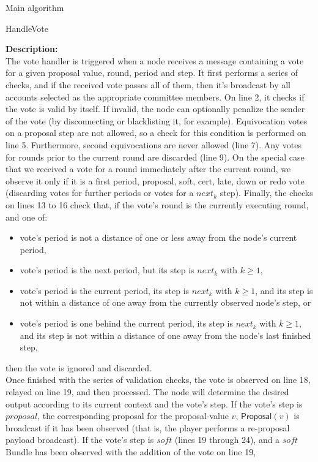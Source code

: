 \documentclass[10pt,a4paper]{article}
\begin{document}
\begin{section}{Main algorithm}
\begin{subsection}{HandleVote}
    
    \noindent \textbf{Description:}\\
The vote handler is triggered when a node receives a message containing a vote for a given proposal value, round, period and step.
It first performs a series of checks, and if the received vote passes all of them, then it's broadcast by all accounts selected
as the appropriate committee members.
On line 2, it checks if the vote is valid by itself. If invalid, the node can optionally penalize the sender of the vote
(by disconnecting or blacklisting it, for example).
Equivocation votes on a proposal step are not allowed, so a check for this condition is performed on line 5.
Furthermore, second equivocations are never allowed (line 7).
Any votes for rounds prior to the current round are discarded (line 9).
On the special case that we received a vote for a round immediately after the current round, we observe it only if it is a first period,
proposal, soft, cert, late, down or redo vote (discarding votes for further periods or votes for a $next_k$ step).
Finally, the checks on lines 13 to 16 check that, if the vote's round is the currently executing round, and one of:
\begin{itemize}
    \item vote's period is not a distance of one or less away from the node's current period,
    \item vote's period is the next period, but its step is $next_{k}$ with $k \geq 1$,
    \item vote's period is the current period, its step is $next_{k}$ with $k \geq 1$, 
and its step is not within a distance of one away from the currently observed node's step, or
    \item vote's period is one behind the current period, its step is $next_{k}$ with $k \geq 1$, and
its step is not within a distance of one away from the node's last finished step,
\end{itemize}
then the vote is ignored and discarded. \\
Once finished with the series of validation checks, the vote is observed on line 18, relayed on line 19, and then processed.
The node will determine the desired output according to its current context and the vote's step.
If the vote's step is $proposal$, the corresponding proposal for the proposal-value $v$, $\mathsf{Proposal}(v)$ is broadcast if it has been observed 
(that is, the player performs a re-proposal payload broadcast).
If the vote's step is $soft$ (lines 19 through 24), and a $soft$ Bundle has been observed with the addition of the vote on line 19,

\end{subsection}
\end{section}
\end{document}
